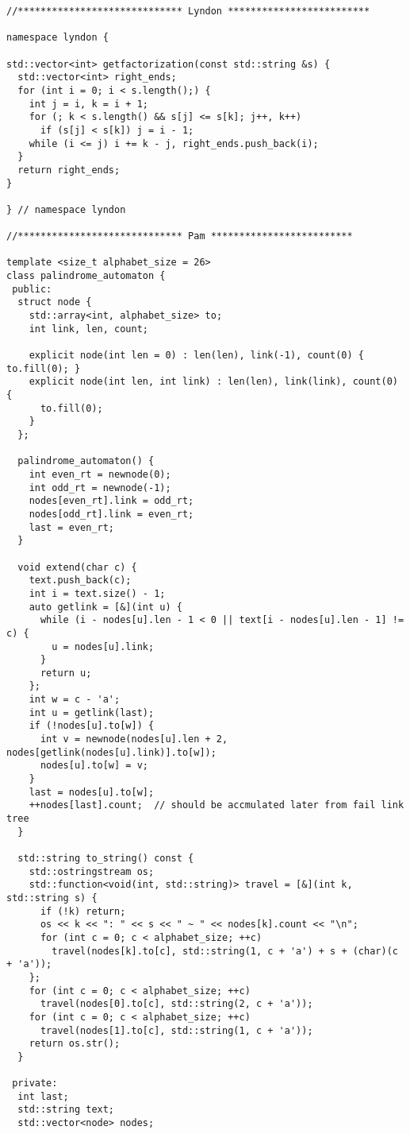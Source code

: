 \documentclass{article}
\begin{document}
\begin{multicols}{2}
  \begin{lstlisting}
//***************************** Lyndon *************************

namespace lyndon {

std::vector<int> getfactorization(const std::string &s) {
  std::vector<int> right_ends;
  for (int i = 0; i < s.length();) {
    int j = i, k = i + 1;
    for (; k < s.length() && s[j] <= s[k]; j++, k++)
      if (s[j] < s[k]) j = i - 1;
    while (i <= j) i += k - j, right_ends.push_back(i);
  }
  return right_ends;
}

} // namespace lyndon

//***************************** Pam *************************

template <size_t alphabet_size = 26>
class palindrome_automaton {
 public:
  struct node {
    std::array<int, alphabet_size> to;
    int link, len, count;

    explicit node(int len = 0) : len(len), link(-1), count(0) { to.fill(0); }
    explicit node(int len, int link) : len(len), link(link), count(0) {
      to.fill(0);
    }
  };

  palindrome_automaton() {
    int even_rt = newnode(0);
    int odd_rt = newnode(-1);
    nodes[even_rt].link = odd_rt;
    nodes[odd_rt].link = even_rt;
    last = even_rt;
  }

  void extend(char c) {
    text.push_back(c);
    int i = text.size() - 1;
    auto getlink = [&](int u) {
      while (i - nodes[u].len - 1 < 0 || text[i - nodes[u].len - 1] != c) {
        u = nodes[u].link;
      }
      return u;
    };
    int w = c - 'a';
    int u = getlink(last);
    if (!nodes[u].to[w]) {
      int v = newnode(nodes[u].len + 2, nodes[getlink(nodes[u].link)].to[w]);
      nodes[u].to[w] = v;
    }
    last = nodes[u].to[w];
    ++nodes[last].count;  // should be accmulated later from fail link tree
  }

  std::string to_string() const {
    std::ostringstream os;
    std::function<void(int, std::string)> travel = [&](int k, std::string s) {
      if (!k) return;
      os << k << ": " << s << " ~ " << nodes[k].count << "\n";
      for (int c = 0; c < alphabet_size; ++c)
        travel(nodes[k].to[c], std::string(1, c + 'a') + s + (char)(c + 'a'));
    };
    for (int c = 0; c < alphabet_size; ++c)
      travel(nodes[0].to[c], std::string(2, c + 'a'));
    for (int c = 0; c < alphabet_size; ++c)
      travel(nodes[1].to[c], std::string(1, c + 'a'));
    return os.str();
  }

 private:
  int last;
  std::string text;
  std::vector<node> nodes;


\end{lstlisting}
\end{multicols}
\end{document}

